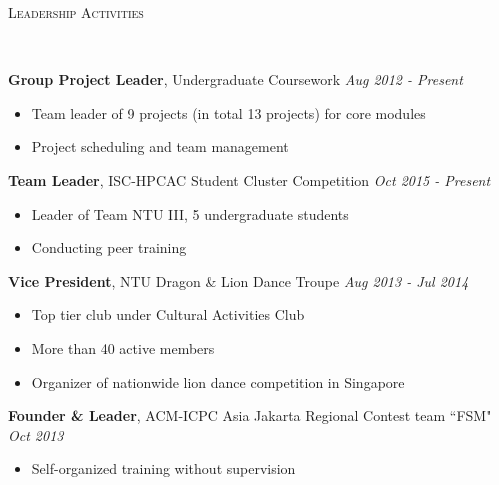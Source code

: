\documentclass[a4paper, 12pt]{article}
\newenvironment{changemargin}[2]{%
  \begin{list}{}{%
      \setlength{\topsep}{0pt}%
      \setlength{\leftmargin}{#1}%
      \setlength{\rightmargin}{#2}%
      \setlength{\listparindent}{\parindent}%
      \setlength{\itemindent}{\parindent}%
      \setlength{\parsep}{\parskip}%
    }%
  \item[]}{\end{list}
}
\newcommand{\lineover}{
  \begin{changemargin}{-0.05in}{-0.05in}
    \vspace*{-8pt}
    \hrulefill \\
    \vspace*{-2pt}
  \end{changemargin}
}
\newcommand{\header}[1]{
  \begin{changemargin}{-0.6in}{-0.6in}
    \fontsize{15}{15}\scshape{#1}\\
    \lineover
    \vspace*{-4pt}
  \end{changemargin}
}
\newenvironment{body}
{
\vspace*{-16pt}
\begin{changemargin}{-0.25in}{-0.5in}
}
{
\end{changemargin}
}
\begin{document}
% 
\header{Leadership Activities}
\begin{body}
  \vspace{14pt}
  \textbf{Group Project Leader}, {Undergraduate Coursework} \hfill \emph{Aug 2012 - Present} \\
  \vspace*{-6pt}
  \begin{itemize} \itemsep -0pt \small
    \item Team leader of 9 projects (in total 13 projects) for core modules
    \item Project scheduling and team management
  \end{itemize}

  \textbf{Team Leader}, {ISC-HPCAC Student Cluster Competition} \hfill \emph{Oct 2015 - Present}\\
  \vspace*{-6pt}
  \begin{itemize} \itemsep -0pt \small
    \item Leader of Team NTU III, 5 undergraduate students
    \item Conducting peer training
  \end{itemize}

  \textbf{Vice President}, NTU Dragon \& Lion Dance Troupe \hfill {} \emph{Aug 2013 - Jul 2014}\\
  \vspace*{-6pt}
  \begin{itemize} \itemsep -0pt \small
    \item Top tier club under Cultural Activities Club
    \item More than 40 active members
    \item Organizer of nationwide lion dance competition in Singapore
  \end{itemize}

  \textbf{Founder \& Leader}, ACM-ICPC Asia Jakarta Regional Contest team ``FSM" \hfill {} \emph{Oct 2013}\\
  \vspace*{-6pt}
  \begin{itemize} \itemsep -0pt \small
    \item Self-organized training without supervision
  \end{itemize}
\end{body}
% 
%
%
\end{document}
